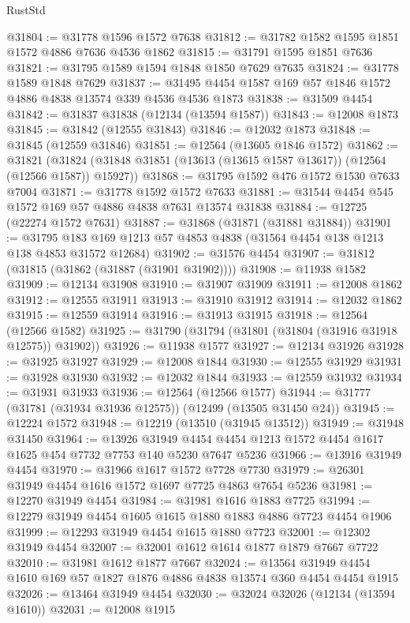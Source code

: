 \begin{lexlean}{RustStd}
\begin{coremodule}
@31804 := @31778 @1596 @1572 @7638
@31812 := @31782 @1582 @1595 @1851 @1572 @4886 @7636 @4536 @1862
@31815 := @31791 @1595 @1851 @7636
@31821 := @31795 @1589 @1594 @1848 @1850 @7629 @7635
@31824 := @31778 @1589 @1848 @7629
@31837 := @31495 @4454 @1587 @169 @57 @1846 @1572 @4886 @4838 @13574 @339 @4536 @4536 @1873
@31838 := @31509 @4454
@31842 := @31837 @31838 (@12134 (@13594 @1587))
@31843 := @12008 @1873
@31845 := @31842 (@12555 @31843)
@31846 := @12032 @1873
@31848 := @31845 (@12559 @31846)
@31851 := @12564 (@13605 @1846 @1572)
@31862 := @31821
    (@31824 (@31848 @31851 (@13613 (@13615 @1587 @13617)) (@12564 (@12566 @1587)) @15927))
@31868 := @31795 @1592 @476 @1572 @1530 @7633 @7004
@31871 := @31778 @1592 @1572 @7633
@31881 := @31544 @4454 @545 @1572 @169 @57 @4886 @4838 @7631 @13574 @31838
@31884 := @12725 (@22274 @1572 @7631)
@31887 := @31868 (@31871 (@31881 @31884))
@31901 := @31795 @183 @169 @1213 @57 @4853 @4838 (@31564 @4454 @138 @1213 @138 @4853 @31572 @12684)
@31902 := @31576 @4454
@31907 := @31812 (@31815 (@31862 (@31887 (@31901 @31902))))
@31908 := @11938 @1582
@31909 := @12134 @31908
@31910 := @31907 @31909
@31911 := @12008 @1862
@31912 := @12555 @31911
@31913 := @31910 @31912
@31914 := @12032 @1862
@31915 := @12559 @31914
@31916 := @31913 @31915
@31918 := @12564 (@12566 @1582)
@31925 := @31790 (@31794 (@31801 (@31804 (@31916 @31918 @12575)) @31902))
@31926 := @11938 @1577
@31927 := @12134 @31926
@31928 := @31925 @31927
@31929 := @12008 @1844
@31930 := @12555 @31929
@31931 := @31928 @31930
@31932 := @12032 @1844
@31933 := @12559 @31932
@31934 := @31931 @31933
@31936 := @12564 (@12566 @1577)
@31944 := @31777 (@31781 (@31934 @31936 @12575)) (@12499 (@13505 @31450 @24))
@31945 := @12224 @1572
@31948 := @12219 (@13510 (@31945 @13512))
@31949 := @31948 @31450
@31964 := @13926
    @31949
    @4454
    @4454
    @1213
    @1572
    @4454
    @1617
    @1625
    @454
    @7732
    @7753
    @140
    @5230
    @7647
    @5236
@31966 := @13916 @31949 @4454
@31970 := @31966 @1617 @1572 @7728 @7730
@31979 := @26301 @31949 @4454 @1616 @1572 @1697 @7725 @4863 @7654 @5236
@31981 := @12270 @31949 @4454
@31984 := @31981 @1616 @1883 @7725
@31994 := @12279 @31949 @4454 @1605 @1615 @1880 @1883 @4886 @7723 @4454 @1906
@31999 := @12293 @31949 @4454 @1615 @1880 @7723
@32001 := @12302 @31949 @4454
@32007 := @32001 @1612 @1614 @1877 @1879 @7667 @7722
@32010 := @31981 @1612 @1877 @7667
@32024 := @13564 @31949 @4454 @1610 @169 @57 @1827 @1876 @4886 @4838 @13574 @360 @4454 @4454 @1915
@32026 := @13464 @31949 @4454
@32030 := @32024 @32026 (@12134 (@13594 @1610))
@32031 := @12008 @1915

\end{coremodule}
\end{lexlean}
